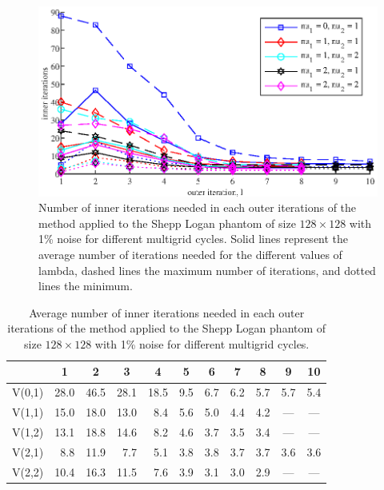 \begin{figure}[htbp]
\begin{center}
\includegraphics{figures/its_cycling}
\caption{Number of inner iterations needed in each outer iterations of the method applied to the Shepp Logan phantom of size $128 \times 128$ with 1\% noise for different multigrid cycles. Solid lines represent the average number of iterations needed for the different values of lambda, dashed lines the maximum number of iterations, and dotted lines the minimum.}
\label{fig:its_cycling}
\end{center}
\end{figure}
\begin{table}[htp]
\caption{Average number of inner iterations needed in each outer iterations of the method applied to the Shepp Logan phantom of size $128 \times 128$ with 1\% noise for different multigrid cycles.}
\begin{center}
\begin{tabular}{|l|r|r|r|r|r|r|r|r|r|r|}
\hline
& \multicolumn{1}{c|}{1} & \multicolumn{1}{c|}{2} & \multicolumn{1}{c|}{3} & \multicolumn{1}{c|}{4} & \multicolumn{1}{c|}{5} & \multicolumn{1}{c|}{6} & \multicolumn{1}{c|}{7} & \multicolumn{1}{c|}{8} & \multicolumn{1}{c|}{9} & \multicolumn{1}{c|}{10} \\
\hline
V(0,1) & 28.0 & 46.5 & 28.1 & 18.5 & 9.5 & 6.7 & 6.2 & 5.7 & 5.7 & 5.4 \\
V(1,1) & 15.0 & 18.0 & 13.0 & 8.4 & 5.6 & 5.0 & 4.4 & 4.2 & \multicolumn{1}{c|}{---} & \multicolumn{1}{c|}{---}\\
V(1,2) & 13.1 & 18.8 & 14.6 & 8.2 & 4.6 & 3.7 & 3.5 & 3.4 & \multicolumn{1}{c|}{---} & \multicolumn{1}{c|}{---} \\
V(2,1) & 8.8 & 11.9 & 7.7 & 5.1 & 3.8 & 3.8 & 3.7 & 3.7 & 3.6 & 3.6 \\
V(2,2) & 10.4 &16.3 & 11.5 & 7.6 & 3.9 & 3.1 & 3.0 & 2.9 & \multicolumn{1}{c|}{---} & \multicolumn{1}{c|}{---} \\
\hline
\end{tabular}
\end{center}
\label{tab:its_cycling}
\end{table}%

